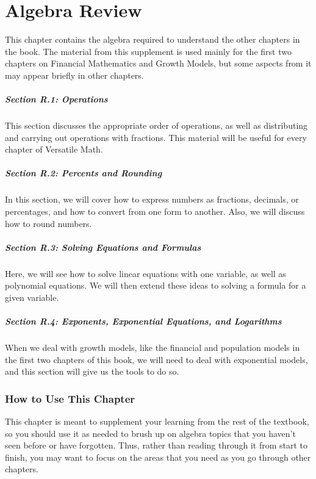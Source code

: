 \documentclass[9pt,letter,twoside,openright]{memoir}
\begin{document}
\pagestyle{algebra}
\setcounter{chapter}{17}%
\renewcommand{\thechapter}{\Alph{chapter}}%
\setcounter{page}{419}
\chapter{Algebra Review}

This chapter contains the algebra required to understand the other chapters in the book.  The material from this supplement is used mainly for the first two chapters on Financial Mathematics and Growth Models, but some aspects from it may appear briefly in other chapters.

\paragraph{Section R.1: Operations} This section discusses the appropriate order of operations, as well as distributing and carrying out operations with fractions.  This material will be useful for every chapter of Versatile Math.
\paragraph{Section R.2: Percents and Rounding} In this section, we will cover how to express numbers as fractions, decimals, or percentages, and how to convert from one form to another.  Also, we will discuss how to round numbers.
\paragraph{Section R.3: Solving Equations and Formulas} Here, we will see how to solve linear equations with one variable, as well as polynomial equations.  We will then extend these ideas to solving a formula for a given variable.
\paragraph{Section R.4: Exponents, Exponential Equations, and Logarithms} When we deal with growth models, like the financial and population models in the first two chapters of this book, we will need to deal with exponential models, and this section will give us the tools to do so.

\subsection{How to Use This Chapter}
This chapter is meant to supplement your learning from the rest of the textbook, so you should use it as needed to brush up on algebra topics that you haven't seen before or have forgotten.  Thus, rather than reading through it from start to finish, you may want to focus on the areas that you need as you go through other chapters.
\end{document}
